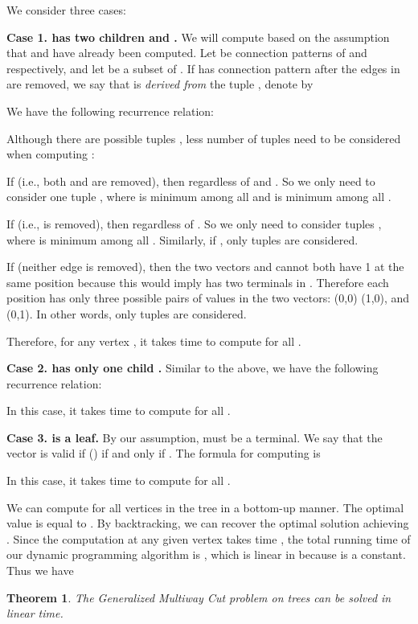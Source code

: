 \documentclass[11pt]{article}
\newtheorem{theorem}{Theorem}[section]
\begin{document}
We consider three cases:

{\bf Case 1.  has two children  and .} We will compute  based on the assumption that  and 
have already been computed. Let  be connection patterns of  and  respectively, and let  be a subset of . If  has connection pattern  after the edges in  are removed, we say that  is {\em derived from} the tuple , denote by 

We have the following recurrence relation:


Although there are  possible tuples
, less number of tuples need to be considered when computing :

If  (i.e., both  and  are removed), then  regardless of  and . So we only need to consider one tuple , where  is minimum among all  and  is minimum among all .

If  (i.e.,  is removed), then  regardless of . So we only need to consider  tuples , where  is minimum among all . Similarly, if , only  tuples are considered.

If  (neither edge is removed), then the two vectors  and  cannot both have 1 at the same position  because this would imply  has two terminals in . Therefore each position  has only three possible pairs of values in the two vectors: (0,0) (1,0), and (0,1). In other words, only  tuples are considered.

Therefore, for any vertex , it takes time  to compute  for all .

{\bf Case 2.  has only one child .} Similar to the above, we have the following recurrence relation:

In this case, it takes time  to compute  for all .

{\bf Case 3.  is a leaf.} By our assumption,  must be a terminal. We say that the vector  is valid if  () if and only if .
The formula for computing  is

In this case, it takes time  to compute  for all .


We can compute  for all vertices  in the tree  in a bottom-up manner.
The optimal value  is equal to
. By backtracking, we can recover the optimal solution achieving
. Since the computation at any given vertex  takes time , the total running time of our dynamic programming algorithm is
, which is linear in  because  is a constant.
Thus we have
\begin{theorem}
\label{th - GMWCT can be solved in linear time}
The Generalized Multiway Cut problem on trees can be solved in linear time.
\end{theorem}
\end{document}
